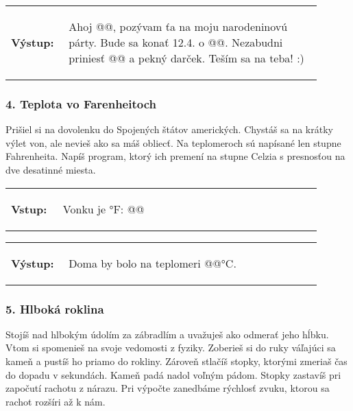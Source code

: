 \vspace{-2em}
\begin{tabular}{@{}p{0.15\linewidth}p{0.75\linewidth}}
\textbf{\small Výstup:} &
\vspace{-3em}
\begin{code}
Ahoj @\fbox{\phantom{vstup}}@,
pozývam ťa na moju narodeninovú párty.
Bude sa konať 12.4. o @\fbox{\phantom{vstup}}@.
Nezabudni priniesť @\fbox{\phantom{vstup}}@ a pekný darček.
Teším sa na teba! :)
\end{code}
\end{tabular}
\vspace{-2em}

\subsubsection*{4. Teplota vo Farenheitoch}
Prišiel si na dovolenku do Spojených štátov amerických. Chystáš sa na krátky výlet von, ale nevieš ako sa máš obliecť. Na teplomeroch sú napísané len stupne Fahrenheita. Napíš program, ktorý ich premení na stupne Celzia s presnosťou na dve desatinné miesta.

\begin{tabular}{@{}p{0.15\linewidth}p{0.75\linewidth}}
\textbf{\small Vstup:} &
\vspace{-3em}
\begin{code}
Vonku je °F: @\fbox{\phantom{vstup}}@
\end{code}
\end{tabular}

\vspace{-2em}
\begin{tabular}{@{}p{0.15\linewidth}p{0.75\linewidth}}
\textbf{\small Výstup:} &
\vspace{-3em}
\begin{code}
Doma by bolo na teplomeri @\fbox{\phantom{vstup}}@°C.
\end{code}
\end{tabular}
\vspace{-2em}

\subsubsection*{5. Hlboká roklina}
Stojíš nad hlbokým údolím za zábradlím a uvažuješ ako odmerať jeho hĺbku. Vtom si spomenieš na svoje vedomosti z fyziky. Zoberieš si do ruky váľajúci sa kameň a pustíš ho priamo do rokliny. Zároveň stlačíš stopky, ktorými zmeriaš čas do dopadu v sekundách. Kameň padá nadol voľným pádom. Stopky zastavíš pri započutí rachotu z nárazu. Pri výpočte zanedbáme rýchlosť zvuku, ktorou sa rachot rozšíri až k nám.

